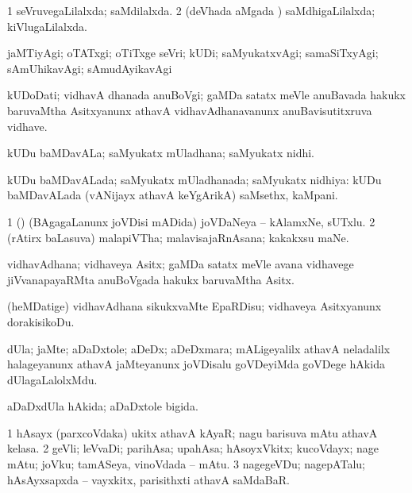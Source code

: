 \bentry
{}
\gl{\gu}
\bmng
\bnum
\num{1} seVruvegaLilalxda; saMdilalxda. 
\num{2} (deVhada aMgada \vi) saMdhigaLilalxda; kiVlugaLilalxda. 
\enum
\emng
\eentry

\bentry
{}
\gl{\kirxvi}
\bmng
jaMTiyAgi; oTATxgi; oTiTxge seVri; kUDi; saMyukatxvAgi; samaSiTxyAgi; sAmUhikavAgi; sAmudAyikavAgi 
\emng
\eentry

\bentry
{}
\gl{\nA}
\bmng
kUDoDati; vidhavA dhanada anuBoVgi; gaMDa satatx meVle anuBavada hakukx baruvaMtha Asitxyanunx athavA vidhavAdhanavanunx anuBavisutitxruva vidhave. 
\emng
\eentry

\bentry
{}
\pron{}
\gl{\nA}
\bmng
kUDu baMDavALa; saMyukatx mUladhana; saMyukatx nidhi. 
\emng
\eentry

\bentry
{}
\gl{\gu}
\bmng
kUDu baMDavALada; saMyukatx mUladhanada; saMyukatx nidhiya:  kUDu baMDavALada (vANijayx athavA keYgArikA) saMsethx, kaMpani. 
\emng
\eentry

\bentry
{}
\gl{\nA}
\bmng
\bnum
\num{1} (\ca) (BAgagaLanunx joVDisi mADida) joVDaNeya -- kAlamxNe, sUTxlu.  
\num{2} (rAtirx baLasuva) malapiVTha; malavisajaRnAsana; kakakxsu maNe. 
\enum
\emng
\eentry

\bentry
{}
\gl{\nA}
\bmng
vidhavAdhana; vidhaveya Asitx; gaMDa satatx meVle avana vidhavege jiVvanapayaRMta anuBoVgada hakukx baruvaMtha Asitx. 
\emng
\eentry

\bentry
{}
\gl{\sakirx}
\bmng
(heMDatige) vidhavAdhana sikukxvaMte EpaRDisu; vidhaveya Asitxyanunx dorakisikoDu. 
\emng
\eentry

\bentry
{}
\gl{\nA}
\bmng
dUla; jaMte; aDaDxtole; aDeDx; aDeDxmara; mALigeyalilx athavA neladalilx halageyanunx athavA jaMteyanunx joVDisalu goVDeyiMda goVDege hAkida dUlagaLalolxMdu. 
\emng
\eentry

\bentry
{}
\gl{\gu}
\bmng
aDaDxdUla hAkida; aDaDxtole bigida. 
\emng
\eentry

\bentry
{}
\gl{\nA}
\bmng
\bnum
\num{1} hAsayx (parxcoVdaka) ukitx athavA kAyaR; nagu barisuva mAtu athavA kelasa. 
\num{2} geVli; leVvaDi; parihAsa; upahAsa; hAsoyxVkitx; kucoVdayx; nage mAtu; joVku; tamASeya, vinoVdada -- mAtu. 
\num{3} nagegeVDu; nagepATalu; hAsAyxsapxda -- vayxkitx, parisithxti athavA saMdaBaR. 
\enum
\emng

